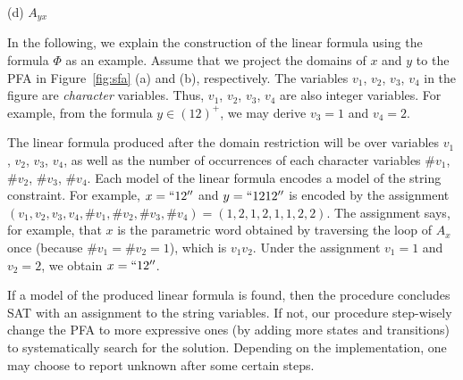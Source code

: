 \documentclass[sigplan,review,anonymous]{acmart}\settopmatter{printfolios=true,printccs=false,printacmref=false}
\begin{document}
\begin{figure*}
\begin{minipage}[t]{0.28\textwidth}
		
		\centering
		(d) $A_{yx}$
	\end{minipage}
	
	\caption{Parametric flat automata of $x$, $y$, $xy$ and $yx$}
	\label{fig:sfa}
\end{figure*}


In the following, we explain the construction of the linear formula using the formula $\Phi$ as an example. Assume that we project the domains of $x$ and $y$ to the PFA in Figure~\ref{fig:sfa} (a) and (b), respectively. The variables $v_1$, $v_2$, $v_3$, $v_4$ in the figure are \emph{character} variables. Thus, $v_1$, $v_2$, $v_3$, $v_4$ are also integer variables. For example, from the formula $ y \in (12)^+$, we may derive $v_3=1$ and $v_4=2$. 

The linear formula produced after the domain restriction will be over variables $v_1$, $v_2$, $v_3$, $v_4$, as well as the number of occurrences of each character variables $\#v_1$, $\#v_2$, $\#v_3$, $\#v_4$. Each model of the linear formula encodes a model of the string constraint. For example, $x=``12''$ and $y=``1212''$ is encoded by the assignment $(v_1,v_2,v_3,v_4,\#v_1,\#v_2,\#v_3,\#v_4)= (1,2,1,2,1,1,2,2)$. The assignment says, for example, that $x$ is the parametric word obtained by traversing the loop of $A_x$ once (because $\#v_1 = \#v_2 = 1$), which is $v_1v_2$. Under the assignment $v_1=1$ and $v_2=2$, we obtain $x=``12''$.

If a model of the produced linear formula is found, then the procedure concludes SAT with an assignment to the string variables. If not, our procedure step-wisely change the PFA to more expressive ones (by adding more states and transitions) to systematically search for the solution. Depending on the implementation, one may choose to report unknown after some certain steps.
\end{document}
